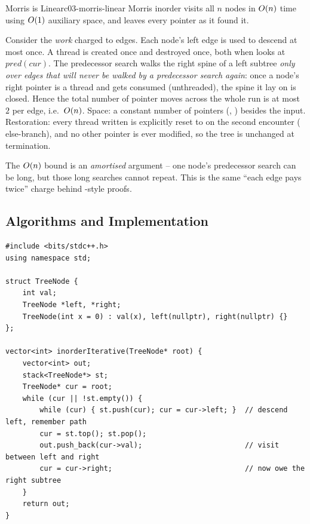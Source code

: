 \begin{theorem}{Morris is Linear}{c03-morris-linear}
Morris inorder visits all $n$ nodes in $O(n)$ time using $O(1)$ auxiliary space,
and leaves every pointer as it found it.
\end{theorem}
\begin{proofbox}
Consider the \emph{work} charged to edges. Each node's left edge is used to descend at
most once. A thread is created once and destroyed once, both when  looks at
$\mathit{pred}(\mathit{cur})$. The predecessor search walks the right spine of a
left subtree \emph{only over edges that will never be walked by a predecessor search
again}: once a node's right pointer is a thread and gets consumed (unthreaded), the
spine it lay on is closed. Hence the total number of pointer moves across the whole run
is at most $2$ per edge, i.e.\ $O(n)$. Space: a constant number of pointers
(, ) besides the input. Restoration: every thread written is
explicitly reset to \nil{} on the second encounter ( else-branch),
and no other pointer is ever modified, so the tree is unchanged at termination.
\end{proofbox}
\begin{insightbox}
The $O(n)$ bound is an \emph{amortised} argument -- one node's predecessor search can
be long, but those long searches cannot repeat. This is the same ``each edge pays twice''
charge behind -style proofs.
\end{insightbox}

\subsection{Algorithms and Implementation}

\begin{lstlisting}[caption={Inorder, explicit stack -- recursion's mirror}, label={lst:c03-inorder-stack}]
#include <bits/stdc++.h>
using namespace std;

struct TreeNode {
    int val;
    TreeNode *left, *right;
    TreeNode(int x = 0) : val(x), left(nullptr), right(nullptr) {}
};

vector<int> inorderIterative(TreeNode* root) {
    vector<int> out;
    stack<TreeNode*> st;
    TreeNode* cur = root;
    while (cur || !st.empty()) {
        while (cur) { st.push(cur); cur = cur->left; }  // descend left, remember path
        cur = st.top(); st.pop();
        out.push_back(cur->val);                        // visit between left and right
        cur = cur->right;                               // now owe the right subtree
    }
    return out;
}
\end{lstlisting}

